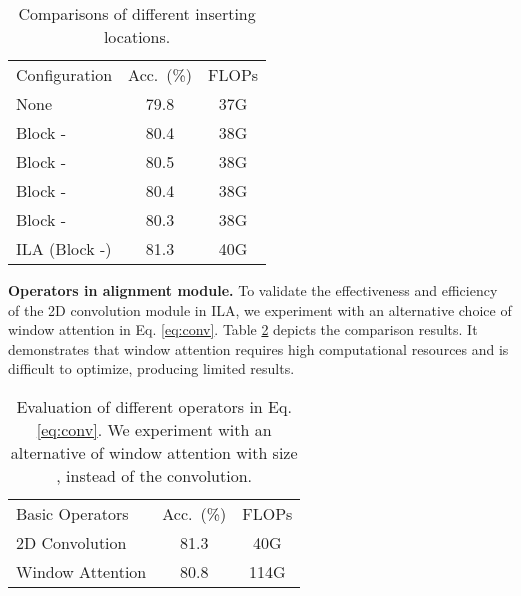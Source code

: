 \documentclass[10pt,twocolumn,letterpaper]{article}
\begin{document}
\begin{table}[h!]\small
\caption{Comparisons of different inserting locations.}
\begin{center}
\renewcommand\arraystretch{1.2}
\begin{tabular}{lcc}
\toprule
Configuration & Acc.~(\%) & FLOPs \\ 
\cmidrule(lr){1-1} \cmidrule(lr){2-2} \cmidrule(lr){3-3}
None          & 79.8     & 37G   \\ 
\cmidrule(lr){1-1} \cmidrule(lr){2-2} \cmidrule(lr){3-3}
Block -     & 80.4     & 38G   \\
Block -     & 80.5     & 38G   \\
Block -     & 80.4     & 38G   \\
Block -    & 80.3     & 38G   \\ 
\cmidrule(lr){1-1} \cmidrule(lr){2-2} \cmidrule(lr){3-3}
ILA (Block -)           & 81.3     & 40G   \\ \bottomrule
\end{tabular}
\end{center}
\label{table:8}
\vspace{-0.1in}
\end{table}



\vspace{0.05in}
\noindent\textbf{Operators in alignment module.} 
To validate the effectiveness and efficiency of the 2D convolution module in ILA, we experiment with an alternative choice of window attention in Eq. \eqref{eq:conv}.
Table \ref{table:9} depicts the comparison results. 
It demonstrates that window attention requires high computational resources and is difficult to optimize, producing limited results. 


\begin{table}[htbp]\small
\caption{Evaluation of different operators in Eq. \eqref{eq:conv}. We experiment with an alternative of window attention with size , instead of the convolution.
}
\begin{center}
\renewcommand\arraystretch{1.2}
\begin{tabular}{lcc}
\toprule
Basic Operators          & Acc.~(\%) & FLOPs \\ 
\cmidrule(lr){1-1} \cmidrule(lr){2-2} \cmidrule(lr){3-3}
2D Convolution           & 81.3     & 40G   \\
Window Attention          & 80.8     & 114G  \\ 
\bottomrule
\end{tabular}
\end{center}
\label{table:9}
\vspace{-0.2in}
\end{table}
\end{document}
